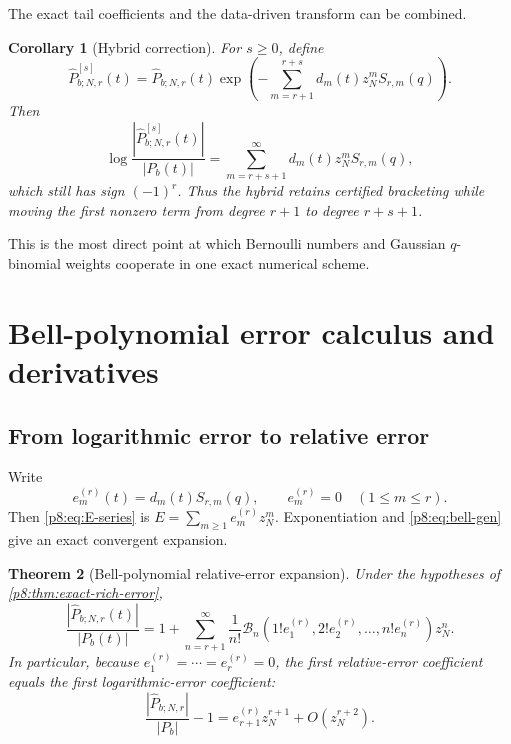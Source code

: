 \documentclass[11pt]{article}
\numberwithin{equation}{section}
\newtheorem{theorem}{Theorem}[section]
\newtheorem{corollary}[theorem]{Corollary}
\theoremstyle{definition}
\theoremstyle{remark}
\begin{document}
The exact tail coefficients and the data-driven transform can be combined.

\begin{corollary}[Hybrid correction]
\label{p8:cor:hybrid}
For $s\ge0$, define
\begin{equation}
\widehat P_{b;N,r}^{[s]}(t)
=\widehat P_{b;N,r}(t)
\exp\!\left(-\sum_{m=r+1}^{r+s}
 d_m(t)z_N^mS_{r,m}(q)\right).
\label{p8:eq:hybrid}
\end{equation}
Then
\begin{equation}
\log\frac{|\widehat P_{b;N,r}^{[s]}(t)|}{|P_b(t)|}
=\sum_{m=r+s+1}^{\infty}d_m(t)z_N^mS_{r,m}(q),
\label{p8:eq:hybrid-error}
\end{equation}
which still has sign $(-1)^r$. Thus the hybrid retains certified bracketing while moving the first nonzero term from degree $r+1$ to degree $r+s+1$.
\end{corollary}

This is the most direct point at which Bernoulli numbers and Gaussian $q$-binomial weights cooperate in one exact numerical scheme.

\section{Bell-polynomial error calculus and derivatives}
\label{p8:sec:bell}

\subsection{From logarithmic error to relative error}

Write
\begin{equation}
e_m^{(r)}(t)=d_m(t)S_{r,m}(q),
\qquad e_m^{(r)}=0\quad(1\le m\le r).
\label{p8:eq:em}
\end{equation}
Then \cref{p8:eq:E-series} is $E=\sum_{m\ge1}e_m^{(r)}z_N^m$. Exponentiation and \cref{p8:eq:bell-gen} give an exact convergent expansion.

\begin{theorem}[Bell-polynomial relative-error expansion]
\label{p8:thm:bell-relative}
Under the hypotheses of \cref{p8:thm:exact-rich-error},
\begin{equation}
\frac{|\widehat P_{b;N,r}(t)|}{|P_b(t)|}
=1+\sum_{n=r+1}^{\infty}
\frac{1}{n!}
\mathcal B_n\!\left(1!e_1^{(r)},2!e_2^{(r)},\ldots,n!e_n^{(r)}\right)z_N^n.
\label{p8:eq:bell-relative}
\end{equation}
In particular, because $e_1^{(r)}=\cdots=e_r^{(r)}=0$, the first relative-error coefficient equals the first logarithmic-error coefficient:
\begin{equation}
\frac{|\widehat P_{b;N,r}|}{|P_b|}-1
=e_{r+1}^{(r)}z_N^{r+1}+O(z_N^{r+2}).
\label{p8:eq:first-relative}
\end{equation}
\end{theorem}
\end{document}
